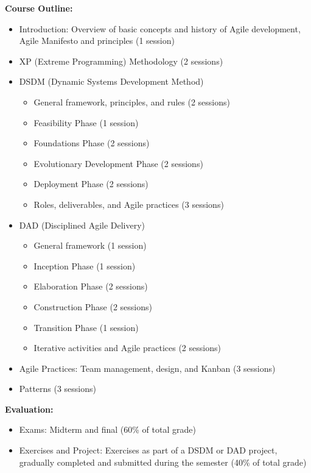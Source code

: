 \documentclass[12pt]{article}
\begin{document}
\textbf{Course Outline:}
\begin{itemize}
    \item Introduction: Overview of basic concepts and history of Agile development, Agile Manifesto and principles (1 session)
    \item XP (Extreme Programming) Methodology (2 sessions)
    \item DSDM (Dynamic Systems Development Method)
    \begin{itemize}
        \item General framework, principles, and rules (2 sessions)
        \item Feasibility Phase (1 session)
        \item Foundations Phase (2 sessions)
        \item Evolutionary Development Phase (2 sessions)
        \item Deployment Phase (2 sessions)
        \item Roles, deliverables, and Agile practices (3 sessions)
    \end{itemize}
    \item DAD (Disciplined Agile Delivery)
    \begin{itemize}
        \item General framework (1 session)
        \item Inception Phase (1 session)
        \item Elaboration Phase (2 sessions)
        \item Construction Phase (2 sessions)
        \item Transition Phase (1 session)
        \item Iterative activities and Agile practices (2 sessions)
    \end{itemize}
    \item Agile Practices: Team management, design, and Kanban (3 sessions)
    \item Patterns (3 sessions)
\end{itemize}

\textbf{Evaluation:}
\begin{itemize}
    \item Exams: Midterm and final (60\% of total grade)
    \item Exercises and Project: Exercises as part of a DSDM or DAD project, gradually completed and submitted during the semester (40\% of total grade)
\end{itemize}
\end{document}
